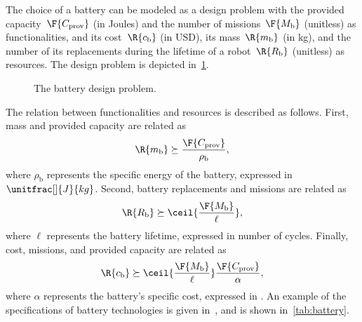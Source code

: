 \begin{example}
The choice of a battery can be modeled as a design problem with the provided capacity~$\F{C_\mathrm{prov}}$ (in \unit[]{Joules}) and the number of missions~$\F{M_\mathrm{b}}$ (unitless) as functionalities, and its cost~$\R{c_\mathrm{b}}$ (in \unit[]{USD}), its mass~$\R{m_\mathrm{b}}$ (in \unit[]{kg}), and the number of its replacements during the lifetime of a robot~$\R{R_\mathrm{b}}$ (unitless) as resources. The design problem is depicted in~\cref{fig:battery}. 

\begin{figure}[tbh]
\begin{center}
\end{center}
\caption{The battery design problem.\label{fig:battery}}
\end{figure}

The relation between functionalities and resources is described as follows. First, mass and provided capacity are related as
\begin{equation}
    \R{m_\mathrm{b}}\succeq \frac{\F{C_\mathrm{prov}}}{\rho_\mathrm{b}},
\end{equation}
where $\rho_\mathrm{b}$ represents the specific energy of the battery, expressed in $\unitfrac[]{J}{kg}$. Second, battery replacements and missions are related as
\begin{equation}
    \R{R_\mathrm{b}}\succeq \ceil{\frac{\F{M_\mathrm{b}}}{\ell}},
\end{equation}
where $\ell$ represents the battery lifetime, expressed in number of cycles. Finally, cost, missions, and provided capacity are related as
\begin{equation}
    \R{c_\mathrm{b}}\succeq  \ceil{\frac{\F{M_\mathrm{b}}}{\ell}} \frac{\F{C_\mathrm{prov}}}{\alpha},
\end{equation}
where $\alpha$ represents the battery's specific cost, expressed in . An example of the specifications of battery technologies is given in~\cite{censi2015}, and is shown in~\cref{tab:battery}.


\end{example}
